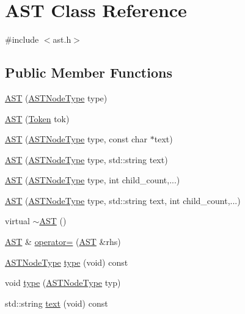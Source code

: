 \hypertarget{class_a_s_t}{
\section{AST Class Reference}
\label{class_a_s_t}
}


{\ttfamily \#include $<$ast.h$>$}

\subsection*{Public Member Functions}
\begin{DoxyCompactItemize}
\item 
\hyperlink{class_a_s_t_a6ac7ddb23729a313ba6b66ad09ab79bd}{AST} (\hyperlink{ast_8h_a0a931957f12a2075e6e11ee596651dff}{ASTNodeType} type)
\item 
\hyperlink{class_a_s_t_a039b00473e1617d1c3003b0a22d5f2d9}{AST} (\hyperlink{class_token}{Token} tok)
\item 
\hyperlink{class_a_s_t_a56011c7a97fd6277c72e88c2acd6a96e}{AST} (\hyperlink{ast_8h_a0a931957f12a2075e6e11ee596651dff}{ASTNodeType} type, const char $\ast$text)
\item 
\hyperlink{class_a_s_t_a341ac3dbf80dad18be249944c0b5f222}{AST} (\hyperlink{ast_8h_a0a931957f12a2075e6e11ee596651dff}{ASTNodeType} type, std::string text)
\item 
\hyperlink{class_a_s_t_a5f463c2fad1523f2dfea906e25e60d91}{AST} (\hyperlink{ast_8h_a0a931957f12a2075e6e11ee596651dff}{ASTNodeType} type, int child\_\-count,...)
\item 
\hyperlink{class_a_s_t_aab868b0cf41c496ee5654fb17e61e63c}{AST} (\hyperlink{ast_8h_a0a931957f12a2075e6e11ee596651dff}{ASTNodeType} type, std::string text, int child\_\-count,...)
\item 
virtual \hyperlink{class_a_s_t_ad332977af5d4ea0ec793c4843544b6e2}{$\sim$AST} ()
\item 
\hyperlink{class_a_s_t}{AST} \& \hyperlink{class_a_s_t_aa28dd92452d4f89c16a4de0058905e16}{operator=} (\hyperlink{class_a_s_t}{AST} \&rhs)
\item 
\hyperlink{ast_8h_a0a931957f12a2075e6e11ee596651dff}{ASTNodeType} \hyperlink{class_a_s_t_ad947af30e5dbb743c41769296dc03c9d}{type} (void) const 
\item 
void \hyperlink{class_a_s_t_a3bf7042778ad5c589b65dd1b276f093c}{type} (\hyperlink{ast_8h_a0a931957f12a2075e6e11ee596651dff}{ASTNodeType} typ)
\item 
std::string \hyperlink{class_a_s_t_ad975048d27d24ffe87e95b1eed995d5e}{text} (void) const 

\end{DoxyCompactItemize}
